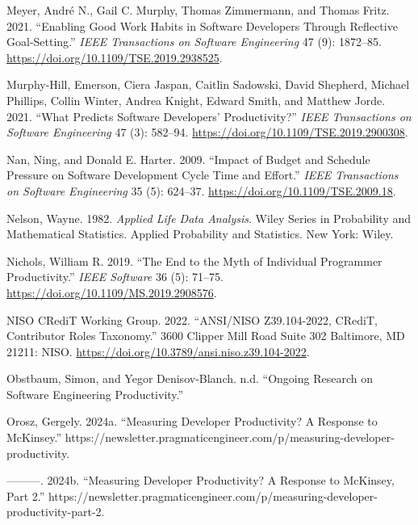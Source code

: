 \documentclass[
]{article}
\newlength{\cslhangindent}
\newenvironment{CSLReferences}[2] %
 {\begin{list}{}{%
  \setlength{\itemindent}{0pt}
  \setlength{\leftmargin}{0pt}
  \setlength{\parsep}{0pt}
  \ifodd #1
   \setlength{\leftmargin}{\cslhangindent}
   \setlength{\itemindent}{-1\cslhangindent}
  \fi
  \setlength{\itemsep}{#2\baselineskip}}}
 {\end{list}}
\begin{document}
\begin{CSLReferences}{1}{0}
Meyer, André N., Gail C. Murphy, Thomas Zimmermann, and Thomas Fritz.
2021. {``Enabling {Good Work Habits} in {Software Developers} Through
{Reflective Goal-Setting}.''} \emph{IEEE Transactions on Software
Engineering} 47 (9): 1872--85.
\url{https://doi.org/10.1109/TSE.2019.2938525}.

Murphy-Hill, Emerson, Ciera Jaspan, Caitlin Sadowski, David Shepherd,
Michael Phillips, Collin Winter, Andrea Knight, Edward Smith, and
Matthew Jorde. 2021. {``What {Predicts Software Developers}'
{Productivity}?''} \emph{IEEE Transactions on Software Engineering} 47
(3): 582--94. \url{https://doi.org/10.1109/TSE.2019.2900308}.

Nan, Ning, and Donald E. Harter. 2009. {``Impact of {Budget} and
{Schedule Pressure} on {Software Development Cycle Time} and
{Effort}.''} \emph{IEEE Transactions on Software Engineering} 35 (5):
624--37. \url{https://doi.org/10.1109/TSE.2009.18}.

Nelson, Wayne. 1982. \emph{Applied Life Data Analysis}. Wiley Series in
Probability and Mathematical Statistics. {Applied} Probability and
Statistics. New York: Wiley.

Nichols, William R. 2019. {``The {End} to the {Myth} of {Individual
Programmer Productivity}.''} \emph{IEEE Software} 36 (5): 71--75.
\url{https://doi.org/10.1109/MS.2019.2908576}.

NISO CRediT Working Group. 2022. {``{ANSI}/{NISO Z39}.104-2022,
{CRediT}, {Contributor Roles Taxonomy}.''} 3600 Clipper Mill Road Suite
302 Baltimore, MD 21211: NISO.
\url{https://doi.org/10.3789/ansi.niso.z39.104-2022}.

Obstbaum, Simon, and Yegor Denisov-Blanch. n.d. {``Ongoing {Research} on
{Software Engineering Productivity}.''}

Orosz, Gergely. 2024a. {``Measuring Developer Productivity? {A} Response
to {McKinsey}.''}
https://newsletter.pragmaticengineer.com/p/measuring-developer-productivity.

---------. 2024b. {``Measuring Developer Productivity? {A} Response to
{McKinsey}, {Part} 2.''}
https://newsletter.pragmaticengineer.com/p/measuring-developer-productivity-part-2.


\end{CSLReferences}
\end{document}
